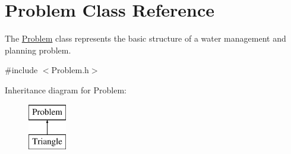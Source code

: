 \hypertarget{classProblem}{}\section{Problem Class Reference}
\label{classProblem}


The {\ttfamily \mbox{\hyperlink{classProblem}{Problem}}} class represents the basic structure of a water management and planning problem.  




{\ttfamily \#include $<$Problem.\+h$>$}

Inheritance diagram for Problem\+:\begin{figure}[H]
\begin{center}
\leavevmode
\includegraphics[height=2.000000cm]{classProblem}
\end{center}
\end{figure}
